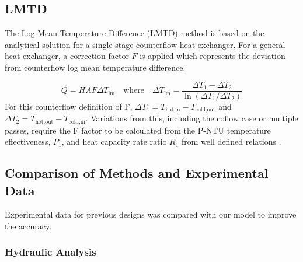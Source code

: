 \documentclass{article}
\begin{document}
\subsection{LMTD}

The Log Mean Temperature Difference (LMTD) method is based on the analytical solution for a single stage counterflow heat exchanger.
For a general heat exchanger, a correction factor $F$ is applied which represents the deviation from counterflow log mean temperature difference.

\begin{equation}
  \dot{Q} = HAF \Delta T_{\text{lm}} \quad \text{where} \quad \Delta T_{\text{lm}} = \frac{\Delta T_1 - \Delta T_2}{\ln(\Delta T_1 / \Delta T_2)}
\end{equation}
For this counterflow definition of F, $\Delta T_1 = T_{\text{hot,in}} - T_{\text{cold,out}}$ and $\Delta T_2 = T_{\text{hot,out}} - T_{\text{cold,in}}$.
Variations from this, including the coflow case or multiple passes, require the F factor to be calculated from the P-NTU temperature effectiveness, $P_1$, and heat capacity rate ratio $R_1$
from well defined relations \cite{HeatTransfer}.


\subsection{Comparison of Methods and Experimental Data}

Experimental data for previous designs was compared with our model to improve the accuracy.

\subsubsection{Hydraulic Analysis}
\end{document}
